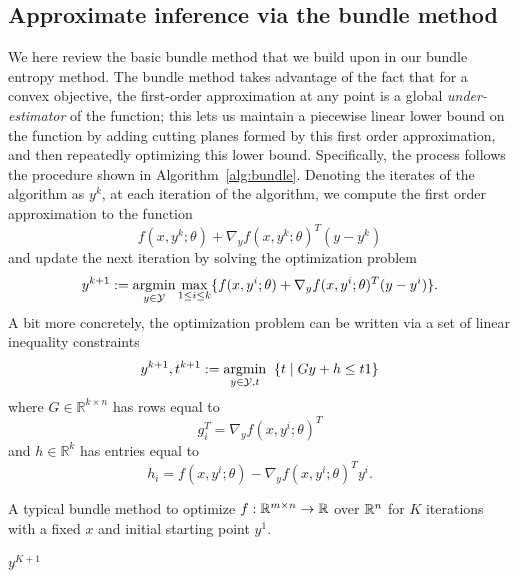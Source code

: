 \subsection{Approximate inference via the bundle method}
\label{sec:icnn:bundle}
We here review the basic bundle method \citep{smola2007bundle} that
we build upon in our bundle entropy method.
The bundle method takes
advantage of the fact that for a convex objective, the first-order approximation
at any point is a global \emph{under-estimator} of the function;
this lets us
maintain a piecewise linear lower bound on the function by adding
cutting planes formed by this first order approximation, and then repeatedly
optimizing this lower bound.  Specifically, the process follows the procedure
shown in Algorithm~\ref{alg:bundle}. Denoting the iterates of the algorithm as
$y^k$, at each iteration of the algorithm, we compute the first order
approximation to the function
\begin{equation}
f(x, y^k;\theta) + \nabla_y f(x, y^k;\theta)^T (y - y^k)
\end{equation}
and update the next iteration by solving the optimization problem
\begin{equation}
y^{k+1} := \operatorname*{argmin}_{y \in \mathcal{Y}} \max_{1\leq i\leq k} \{f(x, y^i;\theta) + \nabla_y f
(x, y^i;\theta)^T (y - y^i)\}.
\end{equation}
A bit more concretely, the optimization problem can be written via a set of linear
inequality constraints
\begin{equation}
y^{k+1},t^{k+1} := \operatorname*{argmin}_{y \in \mathcal{Y}, t} \;\; \{t \mid G y + h \leq
t1\}
\end{equation}
where $G \in \mathbb{R}^{k \times n}$ has rows equal to
\begin{equation}
g_i^T = \nabla_y f (x, y^i;\theta)^T
\end{equation}
and $h \in \mathbb{R}^k$ has entries equal to
\begin{equation}
h_i = f(x, y^i;\theta) - \nabla_y f (x, y^i;\theta)^T y^i.
\end{equation}

\begin{algorithm}[H]
  \caption{A typical bundle method to optimize $f: \mathbb{R}^{m\times n}\rightarrow \mathbb{R}$
    over $\mathbb{R}^n$ for $K$ iterations with a fixed $x$ and initial starting point $y^1$.}
  \begin{algorithmic}[0]
     
    \EndFor
    \State \Return $y^{K+1}$
    \EndFunction
  \end{algorithmic}
  \label{alg:bundle}
\end{algorithm}

